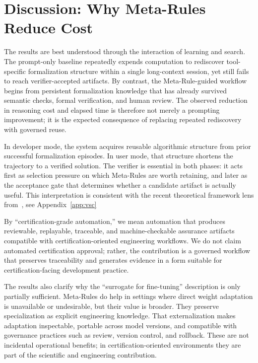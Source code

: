 \documentclass[conference]{IEEEtran}
\begin{document}
\section{Discussion: Why Meta-Rules Reduce Cost}
\label{sec:discussion}

The results are best understood through the interaction of learning and search. The prompt-only baseline repeatedly expends computation to rediscover tool-specific formalization structure within a single long-context session, yet still fails to reach verifier-accepted artifacts. By contrast, the Meta-Rule-guided workflow begins from persistent formalization knowledge that has already survived semantic checks, formal verification, and human review. The observed reduction in reasoning cost and elapsed time is therefore not merely a prompting improvement; it is the expected consequence of replacing repeated rediscovery with governed reuse.

In developer mode, the system acquires reusable algorithmic structure from prior successful formalization episodes. In user mode, that structure shortens the trajectory to a verified solution. The verifier is essential in both phases: it acts first as selection pressure on which Meta-Rules are worth retaining, and later as the acceptance gate that determines whether a candidate artifact is actually useful. This interpretation is consistent with the recent theoretical framework lens
from~\cite{e28030332}, see Appendix~\ref{app:vsc}

By ``certification-grade automation,'' we mean automation that produces reviewable, replayable, traceable, and machine-checkable assurance artifacts compatible with certification-oriented engineering workflows. We do not claim automated certification approval; rather, the contribution is a governed workflow that preserves traceability and generates evidence in a form suitable for certification-facing development practice.

The results also clarify why the ``surrogate for fine-tuning'' description is only partially sufficient. Meta-Rules do help in settings where direct weight adaptation is unavailable or undesirable, but their value is broader. They preserve specialization as explicit engineering knowledge. That externalization makes adaptation inspectable, portable across model versions, and compatible with governance practices such as review, version control, and rollback. These are not incidental operational benefits; in certification-oriented environments they are part of the scientific and engineering contribution.
\end{document}
